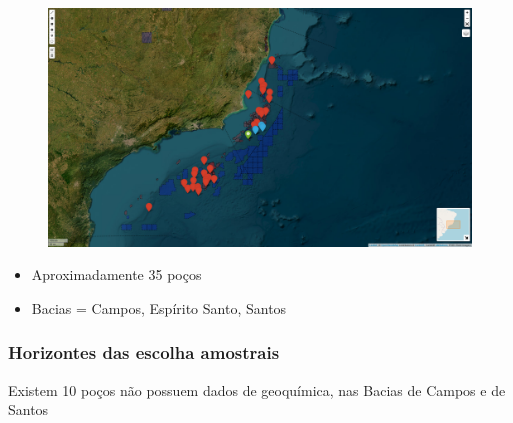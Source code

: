 \documentclass[aspectratio=169]{beamer} %
\begin{document}
{{\begin{frame}
	    \begin{figure}
		    \includegraphics[scale=0.2]{images/GeoPR4_loc.png}
	    \end{figure}
	\begin{itemize}
		\item Aproximadamente 35 poços
                \pause
		\item Bacias = Campos, Espírito Santo, Santos 
	\end{itemize}
\end{frame} 
}


{
\begin{frame}
	\frametitle{Horizontes das escolha amostrais}
   \begin{center}
		Existem 10 poços não possuem dados de geoquímica, nas Bacias de Campos e de Santos 
   \end{center}

	\begin{center}
	\end{center}



\end{frame}}}
\end{document}
